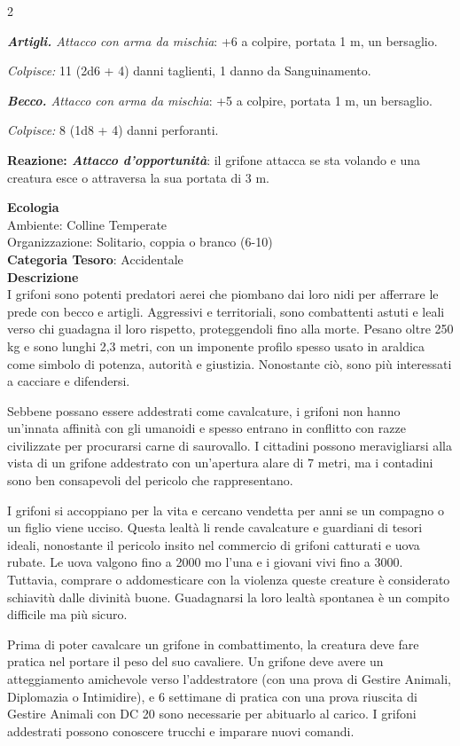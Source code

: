 \begin{multicols}{2}
{\emph{\textbf{Artigli.} Attacco con arma da mischia}: +6 a colpire, portata 1 m, un bersaglio.

\emph{Colpisce:} 11 (2d6 + 4) danni taglienti, 1 danno da Sanguinamento.

\emph{\textbf{Becco.} Attacco con arma da mischia}: +5 a colpire, portata 1 m, un bersaglio.

\emph{Colpisce:} 8 (1d8 + 4) danni perforanti.

\textbf{Reazione: \emph{Attacco d'opportunità}}: il grifone attacca se sta volando e una creatura esce o attraversa la sua portata di 3 m.

\textbf{Ecologia}\\
Ambiente: Colline Temperate\\
Organizzazione: Solitario, coppia o branco (6-10)\\
\textbf{Categoria Tesoro}: Accidentale\\
\textbf{Descrizione}\\
I grifoni sono potenti predatori aerei che piombano dai loro nidi per afferrare le prede con becco e artigli. Aggressivi e territoriali, sono combattenti astuti e leali verso chi guadagna il loro rispetto, proteggendoli fino alla morte. Pesano oltre 250 kg e sono lunghi 2,3 metri, con un imponente profilo spesso usato in araldica come simbolo di potenza, autorità e giustizia. Nonostante ciò, sono più interessati a cacciare e difendersi.

Sebbene possano essere addestrati come cavalcature, i grifoni non hanno un'innata affinità con gli umanoidi e spesso entrano in conflitto con razze civilizzate per procurarsi carne di saurovallo. I cittadini possono meravigliarsi alla vista di un grifone addestrato con un'apertura alare di 7 metri, ma i contadini sono ben consapevoli del pericolo che rappresentano.

I grifoni si accoppiano per la vita e cercano vendetta per anni se un compagno o un figlio viene ucciso. Questa lealtà li rende cavalcature e guardiani di tesori ideali, nonostante il pericolo insito nel commercio di grifoni catturati e uova rubate. Le uova valgono fino a 2000 mo l'una e i giovani vivi fino a 3000. Tuttavia, comprare o addomesticare con la violenza queste creature è considerato schiavitù dalle divinità buone. Guadagnarsi la loro lealtà spontanea è un compito difficile ma più sicuro.

Prima di poter cavalcare un grifone in combattimento, la creatura deve fare pratica nel portare il peso del suo cavaliere. Un grifone deve avere un atteggiamento amichevole verso l'addestratore (con una prova di Gestire Animali, Diplomazia o Intimidire), e 6 settimane di pratica con una prova riuscita di Gestire Animali con DC 20 sono necessarie per abituarlo al carico. I grifoni addestrati possono conoscere trucchi e imparare nuovi comandi.

}
\end{multicols}

